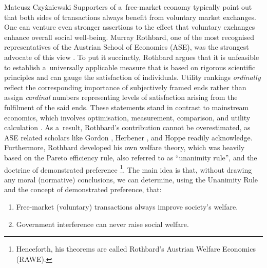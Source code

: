 \begin{newrevengenv}{Mateusz Czyżniewski}
Supporters of a~free-market economy typically point out that both sides of transactions always benefit from voluntary market exchanges. One can venture even stronger assertions to the effect that voluntary exchanges enhance overall social well-being. Murray Rothbard, one of the most recognised representatives of the Austrian School of Economics (ASE), was the strongest advocate of this view 
\parencites[][]{rothbard_ethics_1998}[][]{rothbard_toward_2008}[][]{rothbard_man_2009}. %
 To put it succinctly, Rothbard argues that it is unfeasible to establish a~universally applicable measure that is based on rigorous scientific principles and can gauge the satisfaction of individuals. Utility rankings \textit{ordinally} reflect the corresponding importance of subjectively framed ends rather than assign \textit{cardinal} numbers representing levels of satisfaction arising from the fulfilment of the said ends. These statements stand in contrast to mainstream economics, which involves optimisation, measurement, comparison, and utility calculation 
\parencite[][pp.~173--183, 203--256 \mbox{[orig. 1947]}]{samuelson_foundations_1971}. %
 As a~result, Rothbard's contribution cannot be overestimated, as ASE related scholars like Gordon 
\parencite*[][]{gordon_toward_1993}, %
 Herbener 
\parencite*[][]{herbener_pareto_1997}, %
 and Hoppe 
\parencite*[][]{hoppe_economics_2006} %
 readily acknowledge. Furthermore, Rothbard developed his own welfare theory, which was heavily based on the Pareto efficiency rule, also referred to as ``unanimity rule'', and the doctrine of demonstrated preference 
\parencite[][]{rothbard_toward_2008}%
\footnote{Henceforth, his theorems are called Rothbard's Austrian Welfare Economics (RAWE).}. The main idea is that, without drawing any moral (normative) conclusions, we can determine, using the Unanimity Rule and the concept of demonstrated preference, that:



\begin{enumerate}

\item 
Free-market (voluntary) transactions always improve society's welfare.

\item 
Government interference can never raise social welfare.


\end{enumerate}
\end{newrevengenv}
